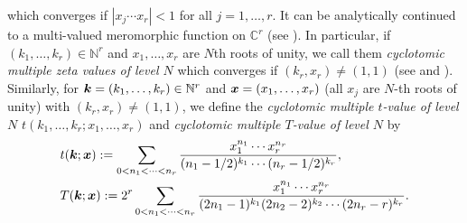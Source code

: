 \documentclass[11pt]{article}
\newcommand{\bfk}{{\boldsymbol{\sl{k}}}}
\newcommand{\bfx}{{\boldsymbol{\sl{x}}}}
\def\N{\mathbb{N}}
\theoremstyle{plain}
\theoremstyle{definition}
\begin{document}
which converges if $|x_j\cdots x_r|<1$ for all $j=1,\dotsc,r$. It can be analytically continued to a multi-valued meromorphic function on $\mathbb{C}^r$ (see \cite{Zhao2007d}). In particular, if $(k_1,\dotsc, k_r)\in\N^r$ and $x_1,\ldots,x_r$ are $N$th roots of unity, we call them \emph{cyclotomic multiple zeta values of level $N$} which converges if $(k_r,x_r)\ne (1,1)$ (see \cite{YuanZh2014a} and \cite[Ch. 15]{Z2016}). Similarly, for $\bfk=(k_1,\ldots,k_r)\in \N^r$ and $\bfx=(x_1,\ldots,x_r)$ (all $x_j$ are $N$-th roots of unity) with $(k_r,x_r)\neq (1,1)$, we define the \emph{cyclotomic multiple $t$-value of level $N$} $t(k_1,\ldots,k_r;x_1,\ldots,x_r)$ and \emph{cyclotomic multiple $T$-value of level $N$} by
\begin{align}
&t(\bfk;\bfx):=\sum_{0<n_1<\cdots<n_r} \frac{x_1^{n_1}\cdots x_r^{n_r}}{(n_1-1/2)^{k_1}\cdots (n_r-1/2)^{k_r}},\\
&T(\bfk;\bfx):=2^r\sum\limits_{0<n_1<\cdots<n_r} \frac{x_1^{n_1}\cdots x_r^{n_r}}{(2n_1-1)^{k_1} (2n_2-2)^{k_2}\cdots(2n_r-r)^{k_r}}.
\end{align}
\end{document}
